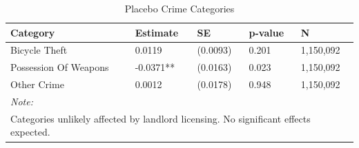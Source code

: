 \begin{table}[!h]
\centering
\caption{\label{tab:placebo}Placebo Crime Categories}
\centering
\begin{tabular}[t]{lllll}
\toprule
Category & Estimate & SE & p-value & N\\
\midrule
Bicycle Theft & 0.0119 & (0.0093) & 0.201 & 1,150,092\\
Possession Of Weapons & -0.0371** & (0.0163) & 0.023 & 1,150,092\\
Other Crime & 0.0012 & (0.0178) & 0.948 & 1,150,092\\
\bottomrule
\multicolumn{5}{l}{\rule{0pt}{1em}\textit{Note: }}\\
\multicolumn{5}{l}{\rule{0pt}{1em}Categories unlikely affected by landlord licensing. No significant effects expected.}\\
\end{tabular}
\end{table}
